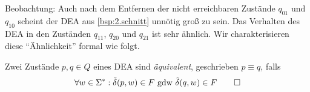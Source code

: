 %         
%
%

\medskip

Beobachtung: Auch nach dem Entfernen der nicht erreichbaren Zustände $q_{01}$ und $q_{10}$ scheint der \acs*{DEA} aus \autoref{bsp:2.schnitt} unnötig groß zu sein. Das Verhalten des \acs*{DEA} in den Zuständen $q_{11}$, $q_{20}$ und $q_{21}$ ist sehr ähnlich. 
Wir charakterisieren diese "`Ähnlichkeit"' formal wie folgt.

\begin{Def}[name={[Äquivalenz von \acs*{DEA}-Zuständen]}] %
  Zwei Zustände $p,q\in Q$ eines \ac{DEA} sind \emph{äquivalent}, geschrieben $p\equiv q$, falls
  \begin{displaymath}
  \forall w\in\Sigma^*: \tilde\delta(p,w)\in F \text{ gdw } \tilde\delta(q,w)\in F
  \qedhere
  \end{displaymath}
\end{Def}

